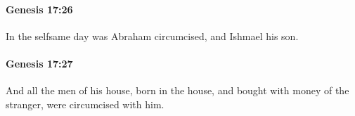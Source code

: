 		\paragraph{Genesis 17:26} %
			\label{GENESIS-17-26}

			In the selfsame day was Abraham circumcised, and Ishmael his son.


		\paragraph{Genesis 17:27} %
			\label{GENESIS-17-27}

			And all the men of his house, born in the house, and bought with money of the stranger, were circumcised with him.

